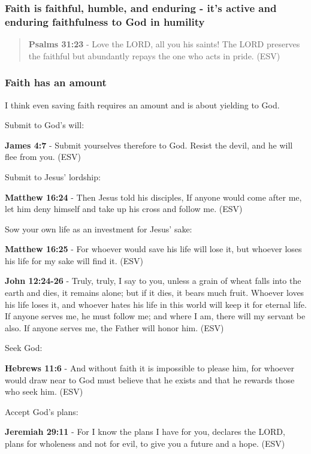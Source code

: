 \documentclass[11pt]{article}
\begin{document}
\subsubsection{Faith is faithful, humble, and enduring - it's active and enduring faithfulness to God in humility}
\label{sec:org8064d17}
\begin{quote}
\textbf{Psalms 31:23} - Love the LORD, all you his saints! The LORD preserves the faithful but abundantly repays the one who acts in pride. (ESV)
\end{quote}

\subsubsection{Faith has an amount}
\label{sec:org91968d2}
I think even saving faith requires an amount and is about yielding to God.

Submit to God's will:

\textbf{James 4:7} - Submit yourselves therefore to God. Resist the devil, and he will flee from you. (ESV)

Submit to Jesus' lordship:

\textbf{Matthew 16:24} - Then Jesus told his disciples, If anyone would come after me, let him deny himself and take up his cross and follow me. (ESV)

Sow your own life as an investment for Jesus' sake:

\textbf{Matthew 16:25} - For whoever would save his life will lose it, but whoever loses his life for my sake will find it. (ESV)

\textbf{John 12:24-26} - Truly, truly, I say to you, unless a grain of wheat falls into the earth and dies, it remains alone; but if it dies, it bears much fruit. Whoever loves his life loses it, and whoever hates his life in this world will keep it for eternal life. If anyone serves me, he must follow me; and where I am, there will my servant be also. If anyone serves me, the Father will honor him. (ESV)

Seek God:

\textbf{Hebrews 11:6} - And without faith it is impossible to please him, for whoever would draw near to God must believe that he exists and that he rewards those who seek him. (ESV)

Accept God's plans:

\textbf{Jeremiah 29:11} - For I know the plans I have for you, declares the LORD, plans for wholeness and not for evil, to give you a future and a hope. (ESV)
\end{document}
